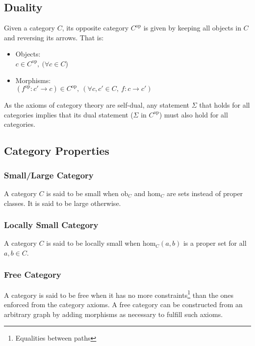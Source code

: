 \subsection{Duality}
Given a category $C$, its opposite category $C^\mathrm{op}$ is given by keeping
all objects in $C$ and reversing its arrows. That is:
\parencite{maclane:working_mathematician}
\begin{itemize}
  \item Objects:\\
    $c\in C^\mathrm{op},\ (\forall c \in C$)
  \item Morphisms:\\
    $(f^\mathrm{op} : c' \to c)\in C^\mathrm{op},
      \ (\forall c, c' \in C,\ f : c \to c')$
\end{itemize}
As the axioms of category theory are self-dual, any statement $\Sigma$ that
holds for all categories implies that its dual statement ($\Sigma$ in
$C^\mathrm{op}$) must also hold for all categories.
\parencite{awodey:category_theory}

\subsection{Category Properties}

\subsubsection*{Small/Large Category}
A category $C$ is said to be small when $\mathrm{ob}_C$ and $\mathrm{hom}_C$ are
sets instead of proper classes. It is said to be large otherwise.
\parencite{awodey:category_theory}

\subsubsection*{Locally Small Category}
A category $C$ is said to be locally small when $\mathrm{hom}_C(a, b)$ is a
proper set for all $a,b\in C$. \parencite{awodey:category_theory}

\subsubsection*{Free Category}
A category is said to be free when it has no more
constraints\footnote{Equalities between paths} than the ones enforced from the
category axioms. \parencite{adamek_herrlich_strecker:joy_cats} A free category
can be constructed from an arbitrary graph by adding morphisms as necessary to
fulfill such axioms.

